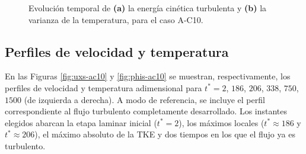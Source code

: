 \begin{figure}[H]
  \centering  
    
  \caption{Evolución temporal de \textbf{(a)} la energía cinética turbulenta y \textbf{(b)} la varianza de la temperatura, para el caso A-C10.}
  \label{fig:ac10-2}
\end{figure}

\subsection{Perfiles de velocidad y temperatura}

En las Figuras \ref{fig:uxs-ac10} y \ref{fig:phis-ac10} se muestran, respectivamente, los perfiles de velocidad y temperatura adimensional para $t^*=2$, $186$, $206$, $338$, $750$, $1500$ (de izquierda a derecha). A modo de referencia, se incluye el perfil correspondiente al flujo turbulento completamente desarrollado. Los instantes elegidos abarcan la etapa laminar inicial ($t^*=2$), los máximos locales ($t^* \approx 186$ y $t^* \approx 206$), el máximo absoluto de la TKE y dos tiempos en los que el flujo ya es turbulento.

